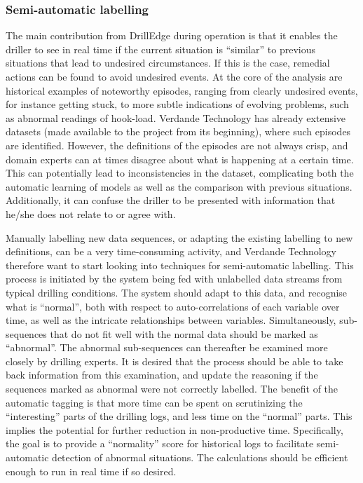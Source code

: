 \subsubsection{Semi-automatic labelling}\label{SubSection:SemiAutomaticLabelling}

The main contribution from DrillEdge during operation is that it enables the driller to see in real time if the current situation is ``similar'' to previous situations that lead to undesired circumstances. If this is the case, remedial actions can be found to avoid undesired events. At the core of the analysis are historical examples of noteworthy episodes, ranging from clearly undesired events, for instance getting stuck, to more subtle indications of evolving problems, such as abnormal readings of hook-load. Verdande Technology has already extensive datasets (made available to the project from its beginning), where such episodes are identified. 
However, the definitions of the episodes are not always crisp, and domain experts can at times disagree about what is happening at a certain time. 
This can potentially lead to inconsistencies in the dataset, complicating both the automatic learning of models as well as the comparison with previous situations. 
Additionally, it can confuse the driller to be presented with information that he/she does not relate to or agree with.

Manually labelling new data sequences, or adapting the existing labelling to new definitions, can be a very time-consuming activity, and Verdande Technology therefore want to start looking into techniques for semi-automatic labelling.
This process is initiated by the system being fed with unlabelled data streams from typical drilling conditions. The system should adapt to this data, and recognise what is ``normal'', both with respect to auto-correlations of each variable over time, as well as the intricate relationships between variables. Simultaneously, sub-sequences that do not fit well with the normal data should be marked as ``abnormal''.
The abnormal sub-sequences can thereafter be examined more closely by drilling experts. It is desired that the process should be able to take back information from this examination, and update the reasoning if the sequences marked as abnormal were not correctly labelled. The benefit of the automatic tagging is that more time can be spent on scrutinizing the ``interesting'' parts of the drilling logs, and less time on the ``normal'' parts. 
This implies the potential for further reduction in non-productive time. Specifically, the goal is to provide a ``normality'' score for historical logs to facilitate semi-automatic detection of abnormal situations. The calculations should be efficient enough to run in real time if so desired.

